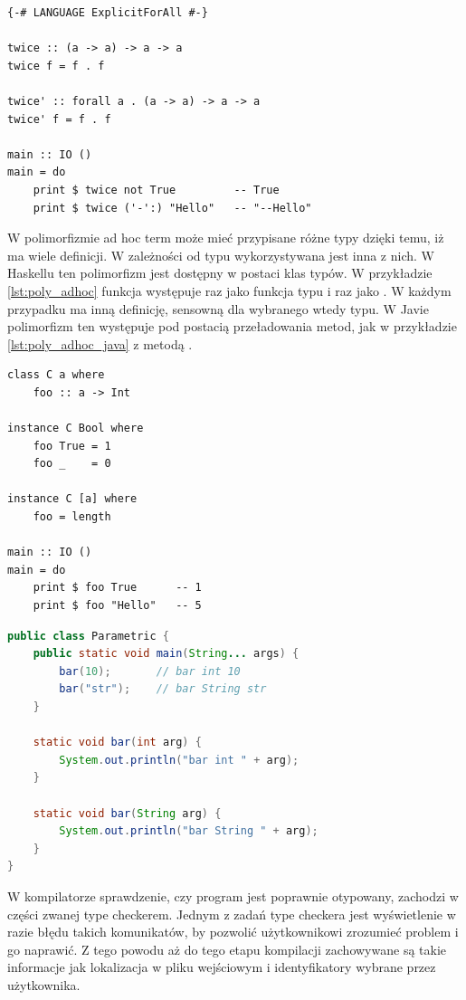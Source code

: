 {\begin{lstlisting}[float,label={lst:poly_parametric},
                   caption={Przykład użycia polimorfizmu parametrycznego w Haskellu.}]
{-# LANGUAGE ExplicitForAll #-}

twice :: (a -> a) -> a -> a
twice f = f . f

twice' :: forall a . (a -> a) -> a -> a
twice' f = f . f

main :: IO ()
main = do
    print $ twice not True         -- True
    print $ twice ('-':) "Hello"   -- "--Hello"
\end{lstlisting}

W polimorfizmie ad hoc term może mieć przypisane różne typy dzięki temu,
iż ma wiele definicji. W zależności od typu wykorzystywana jest inna z nich.
W Haskellu ten polimorfizm jest dostępny w postaci klas typów\cite{TAPL}.
W przykładzie \ref{lst:poly_adhoc} funkcja  występuje raz jako
funkcja typu  i raz jako . W każdym
przypadku ma inną definicję, sensowną dla wybranego wtedy typu. W Javie
polimorfizm ten występuje pod postacią przeładowania metod, jak w przykładzie
\ref{lst:poly_adhoc_java} z metodą .

\begin{lstlisting}[float,label={lst:poly_adhoc},
                   caption={Przykład użycia polimorfizmu ad hoc w Haskellu.}]
class C a where
    foo :: a -> Int

instance C Bool where
    foo True = 1
    foo _    = 0

instance C [a] where
    foo = length

main :: IO ()
main = do
    print $ foo True      -- 1
    print $ foo "Hello"   -- 5
\end{lstlisting}

\begin{lstlisting}[float,language=Java,label={lst:poly_adhoc_java},
                   caption={Przykład użycia polimorfizmu ad hoc w Javie.}]
public class Parametric {
    public static void main(String... args) {
        bar(10);       // bar int 10
        bar("str");    // bar String str
    }

    static void bar(int arg) {
        System.out.println("bar int " + arg);
    }

    static void bar(String arg) {
        System.out.println("bar String " + arg);
    }
}
\end{lstlisting}

W kompilatorze sprawdzenie, czy program jest poprawnie otypowany, zachodzi w części
zwanej type checkerem. Jednym z zadań type checkera jest wyświetlenie w razie błędu takich
komunikatów, by pozwolić użytkownikowi zrozumieć problem i go naprawić.
Z tego powodu aż do tego etapu kompilacji zachowywane są takie informacje
jak lokalizacja w pliku wejściowym i identyfikatory wybrane przez użytkownika.

}
